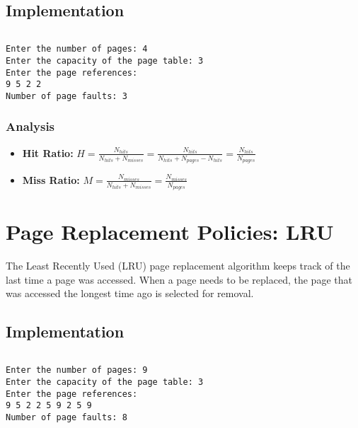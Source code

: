 \subsection{Implementation}

\inputminted[fontsize=\footnotesize]{c}{code/page_fifo.c}

\begin{lstlisting}[style=output]
Enter the number of pages: 4
Enter the capacity of the page table: 3
Enter the page references:
9 5 2 2
Number of page faults: 3
\end{lstlisting}

\subsubsection{Analysis}

\begin{itemize}
	\item \textbf{Hit Ratio:} $H = \frac{N_{hits}}{N_{hits} + N_{misses}} = \frac{N_{hits}}{N_{hits} + N_{pages} - N_{hits}} = \frac{N_{hits}}{N_{pages}}$
	\item \textbf{Miss Ratio:} $M = \frac{N_{misses}}{N_{hits} + N_{misses}} = \frac{N_{misses}}{N_{pages}}$
\end{itemize}


\section{Page Replacement Policies: LRU}
\label{sec:page-replacement-lru}

The Least Recently Used (LRU) page replacement algorithm
keeps track of the last time a page was accessed.
When a page needs to be replaced, the page that was accessed the longest time ago is selected for removal.

\subsection{Implementation}

\inputminted[fontsize=\footnotesize]{c}{code/page_lru.c}

\begin{lstlisting}[style=output]
Enter the number of pages: 9
Enter the capacity of the page table: 3
Enter the page references:
9 5 2 2 5 9 2 5 9
Number of page faults: 8
\end{lstlisting}

